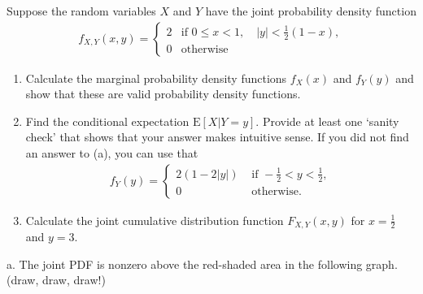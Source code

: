 \begin{exercise}
 Suppose the random variables $X$ and $Y$ have the joint probability density function
\begin{align*}
    f_{X,Y}(x,y) = \left\{\begin{array}{cl}
        2 & \text{if } 0\leq x< 1,\quad  |y|<\frac{1}{2}(1-x),\\
        0 & \text{otherwise}
    \end{array}\right.
\end{align*}

\begin{enumerate}
\item Calculate the marginal probability density functions $f_{X}(x)$ and $f_{Y}(y)$ and show that these are valid probability density functions.
\item Find the conditional expectation $\text{E}[X|Y=y]$. Provide at least one `sanity check' that shows that your answer makes intuitive sense.
    If you did not find an answer to (a), you can use that
    \begin{align*}
        f_{Y}(y) = \left\{\begin{array}{ll}
            2(1-2|y|)&\text{ if } -\frac{1}{2}< y<\frac{1}{2},\\
            0 & \text{ otherwise}.
        \end{array}\right.
    \end{align*}
\item Calculate the joint cumulative distribution function $F_{X,Y}(x,y)$ for $x=\frac{1}{2}$ and $y=3$.
\end{enumerate}


\begin{solution}
a.             The joint PDF is nonzero above the red-shaded area in the following graph. (draw, draw, draw!)
            \begin{center}
\end{center}
\end{solution}
\end{exercise}
